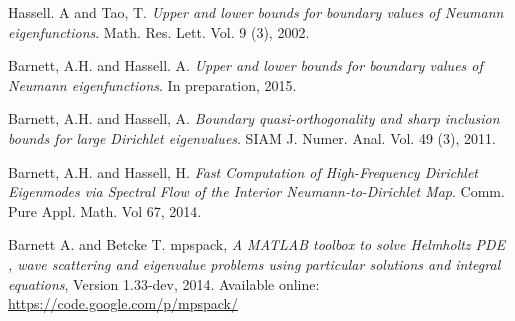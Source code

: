 \documentclass{article}
\begin{document}
\begin{thebibliography}{9}

Hassell. A and Tao, T.
\textsl{Upper and lower bounds for boundary values of Neumann eigenfunctions}.
Math. Res. Lett. Vol. 9 (3), 2002. %

Barnett, A.H. and Hassell. A.
\textsl{Upper and lower bounds for boundary values of Neumann eigenfunctions}.
In preparation, 2015.

Barnett, A.H. and Hassell, A.
\textsl{Boundary quasi-orthogonality and sharp inclusion bounds for large Dirichlet eigenvalues}.
SIAM J. Numer. Anal. Vol. 49 (3), 2011.

Barnett, A.H. and Hassell, H.
\textsl{Fast Computation of High-Frequency Dirichlet Eigenmodes via Spectral Flow of the Interior Neumann-to-Dirichlet Map}.
Comm. Pure Appl. Math. Vol 67, 2014.

Barnett A. and Betcke T.
mpspack,
\textsl{A MATLAB toolbox to solve Helmholtz PDE , wave scattering and eigenvalue problems using particular solutions and integral equations},
Version 1.33-dev, 2014.
Available online: \url{https://code.google.com/p/mpspack/}

\end{thebibliography}
\end{document}
